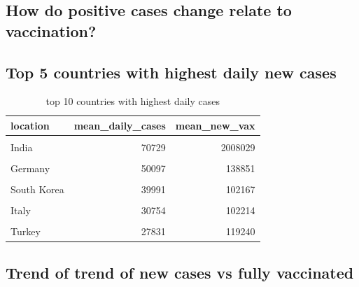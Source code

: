 \documentclass[11pt,a4paper,]{article}
\begin{document}
\clearpage

\hypertarget{how-do-positive-cases-change-relate-to-vaccination}{%
\subsection{\texorpdfstring{\textbf{How do positive cases change relate to vaccination?}}{How do positive cases change relate to vaccination?}}\label{how-do-positive-cases-change-relate-to-vaccination}}

\subsection*{Top 5 countries with highest daily new cases}

\begin{table}[!h]

\caption{\label{tab:table3}top 10 countries with highest daily cases}
\centering
\begin{tabular}[t]{lrr}
\toprule
location & mean\_daily\_cases & mean\_new\_vax\\
\midrule
\cellcolor{gray!6}{United States} & \cellcolor{gray!6}{120485} & \cellcolor{gray!6}{460807}\\
India & 70729 & 2008029\\
\cellcolor{gray!6}{France} & \cellcolor{gray!6}{56649} & \cellcolor{gray!6}{114808}\\
Germany & 50097 & 138851\\
\cellcolor{gray!6}{Brazil} & \cellcolor{gray!6}{46861} & \cellcolor{gray!6}{372420}\\
\addlinespace
South Korea & 39991 & 102167\\
\cellcolor{gray!6}{United Kingdom} & \cellcolor{gray!6}{38446} & \cellcolor{gray!6}{110154}\\
Italy & 30754 & 102214\\
\cellcolor{gray!6}{Russia} & \cellcolor{gray!6}{29095} & \cellcolor{gray!6}{203228}\\
Turkey & 27831 & 119240\\
\bottomrule
\end{tabular}
\end{table}

\subsection*{Trend of trend of new cases vs fully vaccinated}
\end{document}

